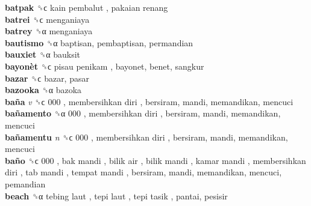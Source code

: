 \textbf{batpak} ␝ϲ   kain pembalut ,  pakaian renang   \\
\textbf{batrei} ␝ϲ  menganiaya  \\
\textbf{batrey} ␝α  menganiaya  \\
\textbf{bautismo} ␝α  baptisan, pembaptisan, permandian  \\
\textbf{bauxiet} ␝α  bauksit  \\
\textbf{bayonèt} ␝ϲ   pisau penikam , bayonet, benet, sangkur  \\
\textbf{bazar} ␝ϲ  bazar, pasar  \\
\textbf{bazooka} ␝α  bazoka  \\
\textbf{baña} \emph{v}  ␝ϲ   000 ,  membersihkan diri , bersiram, mandi, memandikan, mencuci  \\
\textbf{bañamento} ␝α   000 ,  membersihkan diri , bersiram, mandi, memandikan, mencuci  \\
\textbf{bañamentu} \emph{n}  ␝ϲ   000 ,  membersihkan diri , bersiram, mandi, memandikan, mencuci  \\
\textbf{baño} ␝ϲ   000 ,  bak mandi ,  bilik air ,  bilik mandi ,  kamar mandi ,  membersihkan diri ,  tab mandi ,  tempat mandi , bersiram, mandi, memandikan, mencuci, pemandian  \\
\textbf{beach} ␝α   tebing laut ,  tepi laut ,  tepi tasik , pantai, pesisir  \\
